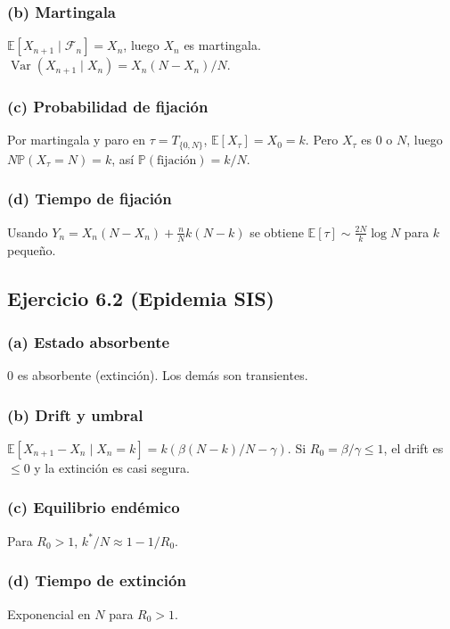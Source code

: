 \documentclass[letterpaper, 12pt]{article}
\newcommand{\E}{\mathbb{E}}
\renewcommand{\P}{\mathbb{P}}
\newcommand{\F}{\mathcal{F}}
\newcommand{\1}{\mathbbm{1}}
\DeclareMathOperator{\Var}{Var}
\begin{document}
    \subsubsection*{(b) Martingala}
    $\E[X_{n+1}\mid\F_n]=X_n$, luego $X_n$ es martingala. $\Var(X_{n+1}\mid X_n)=X_n(N-X_n)/N$.

    \subsubsection*{(c) Probabilidad de fijaci\'on}
    Por martingala y paro en $\tau=T_{\{0,N\}}$, $\E[X_\tau]=X_0=k$. Pero $X_\tau$ es $0$ o $N$, luego $N\P(X_\tau=N)=k$, as\'i $\P(\text{fijaci\'on})=k/N$.

    \subsubsection*{(d) Tiempo de fijaci\'on}
    Usando $Y_n=X_n(N-X_n)+\frac{n}{N}k(N-k)$ se obtiene $\E[\tau]\sim\frac{2N}{k}\log N$ para $k$ peque\~no.

    \subsection{Ejercicio 6.2 (Epidemia SIS)}

    \subsubsection*{(a) Estado absorbente}
    $0$ es absorbente (extinci\'on). Los dem\'as son transientes.

    \subsubsection*{(b) Drift y umbral}
    $\E[X_{n+1}-X_n\mid X_n=k]=k(\beta(N-k)/N-\gamma)$. Si $R_0=\beta/\gamma\le1$, el drift es $\le0$ y la extinci\'on es casi segura.

    \subsubsection*{(c) Equilibrio end\'emico}
    Para $R_0>1$, $k^*/N\approx1-1/R_0$.

    \subsubsection*{(d) Tiempo de extinci\'on}
    Exponencial en $N$ para $R_0>1$.
\end{document}
